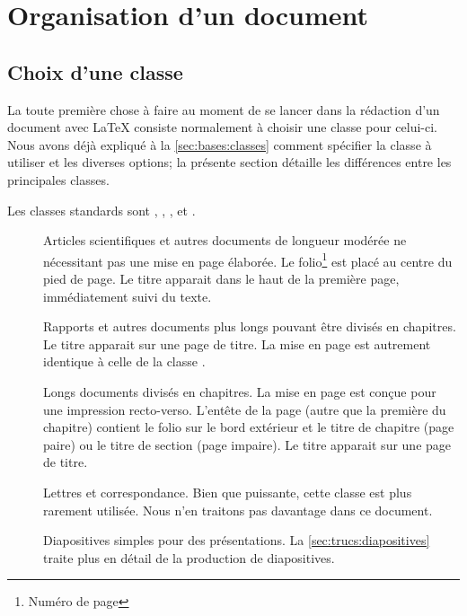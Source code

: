 \chapter{Organisation d'un document}
\label{chap:organisation}


\section{Choix d'une classe}
\label{sec:organisation:classe}

La toute première chose à faire au moment de se lancer dans la
rédaction d'un document avec {\LaTeX} consiste normalement à choisir
une classe pour celui-ci. Nous avons déjà expliqué à la
\autoref{sec:bases:classes} comment spécifier la classe à utiliser
et les diverses options; la présente section détaille les différences
entre les principales classes.

Les classes standards sont , ,
,  et .

\begin{description}
\item[\normalfont{}] Articles scientifiques et autres
  documents de longueur modérée ne nécessitant pas une mise en page
  élaborée. Le folio\footnote{Numéro de page} est placé au centre du
  pied de page. Le titre apparait dans le haut de la première page,
  immédiatement suivi du texte.
\item[\normalfont{}] Rapports et autres documents plus
  longs pouvant être divisés en chapitres. Le titre apparait sur une
  page de titre. La mise en page est autrement identique à celle de la
  classe .
\item[\normalfont{}] Longs documents divisés en chapitres.
  La mise en page est conçue pour une impression recto-verso. L'entête
  de la page (autre que la première du chapitre) contient le folio sur
  le bord extérieur et le titre de chapitre (page paire) ou le titre
  de section (page impaire). Le titre apparait sur une page de titre.
\item[\normalfont{}] Lettres et correspondance. Bien que
  puissante, cette classe est plus rarement utilisée. Nous n'en traitons
  pas davantage dans ce document.
\item[\normalfont{}] Diapositives simples pour des
  présentations. La \autoref{sec:trucs:diapositives} traite plus en
  détail de la production de diapositives.
\end{description}

